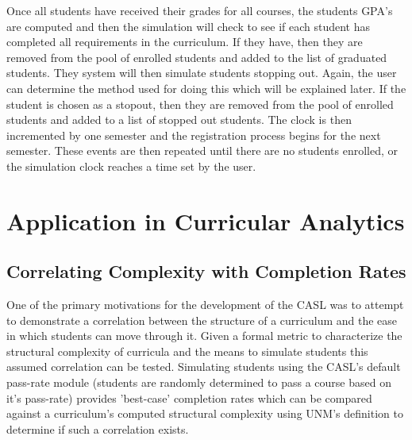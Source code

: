 \documentclass[botnum, fleqn]{unmeethesis}
\begin{document}
    Once all students have received their grades for all courses, the students GPA's are computed and then the simulation will check to see if each student has completed all requirements in the curriculum. If they have, then they are removed from the pool of enrolled students and added to the list of graduated students. They system will then simulate students stopping out. Again, the user can determine the method used for doing this which will be explained later. If the student is chosen as a stopout, then they are removed from the pool of enrolled students and added to a list of stopped out students. The clock is then incremented by one semester and the registration process begins for the next semester. These events are then repeated until there are no students enrolled, or the simulation clock reaches a time set by the user.


\chapter{Application in Curricular Analytics}

  \section{Correlating Complexity with Completion Rates}
    One of the primary motivations for the development of the CASL was to attempt to demonstrate a correlation between the structure of a curriculum and the ease in which students can move through it. Given a formal metric to characterize the structural complexity of curricula and the means to simulate students this assumed correlation can be tested. Simulating students using the CASL's default pass-rate module (students are randomly determined to pass a course based on it's pass-rate) provides 'best-case' completion rates which can be compared against a curriculum's computed structural complexity using UNM's definition to determine if such a correlation exists.

\end{document}
